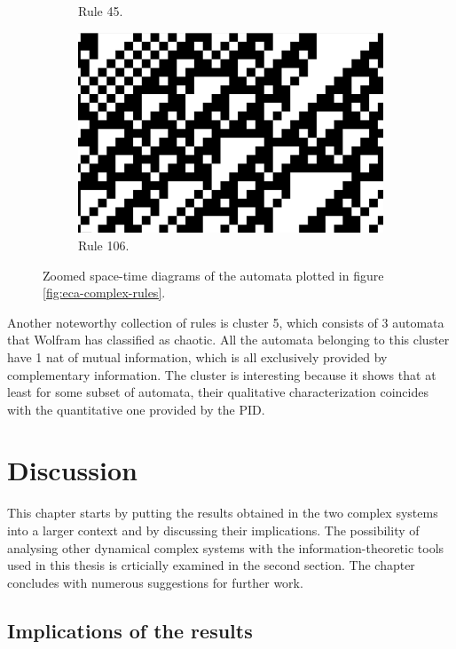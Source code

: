 \documentclass[12pt]{article}
\begin{document}
\begin{figure} [h]
\begin{subfigure}{.5\textwidth}
  \caption{Rule 45.}
  \label{fig:rule45-zoomed}
\end{subfigure}
\begin{subfigure}{.5\textwidth}
  \centering
  \includegraphics[width=.9\linewidth]{rule106-zoomed}
  \caption{Rule 106.}
  \label{fig:rule106-zoomed}
\end{subfigure}
\caption{Zoomed space-time diagrams of the automata plotted in figure \ref{fig:eca-complex-rules}.}
\label{fig:eca-complex-rules-zoomed}
\end{figure}

Another noteworthy collection of rules is cluster 5, which consists  of 3 automata that Wolfram has classified as chaotic. All the automata belonging to this cluster have 1 nat of mutual information, which is all exclusively provided by complementary information. The cluster is interesting because it shows that at least for some subset of automata, their qualitative characterization coincides with the quantitative one provided by the PID. 

\newpage
\section{Discussion}

This chapter starts by putting the results obtained in the two complex systems into a larger context and by discussing their implications.  The possibility of analysing other dynamical complex systems with the information-theoretic tools used in this thesis is crticially examined in the second section. The chapter concludes with numerous suggestions for further work. 

\subsection{Implications of the results}
\end{document}
